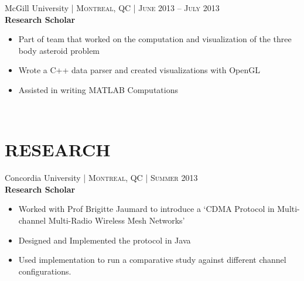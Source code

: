 \documentclass[10pt]{article} %
\begin{document}
{\begin{minipage}[t]{0.57\textwidth}


{\raggedright\large McGill University \normalsize\textsc{ | Montreal, QC | June 2013 -- July 2013}\\
\textbf{Research Scholar}\\[5pt]}
\begin{itemize}\itemsep-0.25em \item Part of team that worked on the computation and visualization of the three body asteroid problem \item Wrote a C++ data parser and created visualizations with OpenGL \item Assisted in writing MATLAB Computations
\end{itemize}\\

\section{\uppercase{\textbf{Research}}}


{\raggedright\large Concordia University \normalsize\textsc{ | Montreal, QC | Summer 2013}\\
\textbf{Research Scholar}\\[5pt]}
\begin{itemize}\itemsep-0.25em \item Worked with Prof Brigitte Jaumard to introduce a ‘CDMA Protocol in Multi-channel Multi-Radio Wireless Mesh Networks’ \item  Designed and Implemented the protocol in Java \item Used implementation to run a comparative study against different channel configurations.\end{itemize}\\




\end{minipage}}
\end{document}

